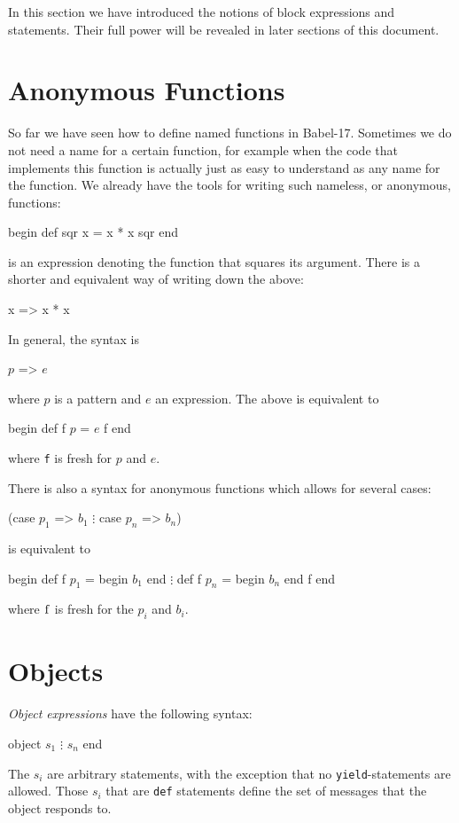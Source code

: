 \documentclass[11pt]{amsart}
\newcommand{\babelsrc}[1] {\lstinline!#1!}
\begin{document}
In this section we have introduced the notions of block expressions and statements. Their full power will be revealed in later sections of this document.

\section{Anonymous Functions}
So far we have seen how to define named functions in Babel-17. Sometimes we do not need a name for a certain function, for example when the code that implements this function is actually just as easy to understand as any name for the function. We already have the tools for writing such nameless, or anonymous, functions:
\begin{babellisting}
begin
  def sqr x = x * x 
  sqr
end
\end{babellisting}
is an expression denoting the function that squares its argument. There is a shorter and equivalent way of writing down the above:
\begin{babellisting}
x => x * x
\end{babellisting}
In general, the syntax is
\begin{babellisting}
$p$ => $e$
\end{babellisting}
where $p$ is a pattern and $e$ an expression. The above is equivalent to
\begin{babellisting}
begin
  def f $p$ = $e$ 
  f
end
\end{babellisting}
where \babelsrc{f} is fresh for $p$ and $e$.


There is also a syntax for anonymous functions which allows for several cases:
\begin{babellisting}
(case $p_1$ => $b_1$
    $\vdots$
 case $p_n$ => $b_n$)
\end{babellisting}
is equivalent to 
\begin{babellisting}
begin
  def f $p_1$ = begin $b_1$ end
    $\vdots$
  def f $p_n$ = begin $b_n$ end
  f
end
\end{babellisting}
where $\babelsrc{f}$ is fresh for the $p_i$ and $b_i$.

\section{Objects}
\emph{Object expressions} have the following syntax:
\begin{babellisting}
object 
  $s_1$
  $\vdots$
  $s_n$
end
\end{babellisting}
The $s_i$ are arbitrary statements, with the exception that no \babelsrc{yield}-statements are allowed.  Those $s_i$ that are  \babelsrc{def} statements define the set of messages that the object responds to.
\end{document}
